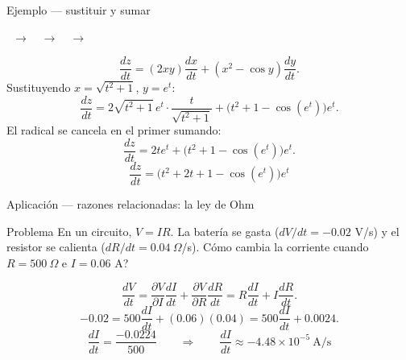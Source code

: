 \documentclass[11pt,aspectratio=169]{beamer}
\newcommand{\rctracker}[1]{%
  {\footnotesize\centering
  \pasoitem{1}{1. Dependencias}{#1}\ $\rightarrow$\
  \pasoitem{2}{2. Parciales de $z$}{#1}\ $\rightarrow$\
  \pasoitem{3}{3. Derivar intermedias}{#1}\ $\rightarrow$\
  \pasoitem{4}{4. Sustituir y sumar}{#1}\par}
  \vspace{4pt}
}
\begin{document}
\begin{frame}{Ejemplo --- sustituir y sumar}
  \rctracker{4}
  \[
    \frac{dz}{dt}=(2xy)\frac{dx}{dt}+(x^2-\cos y)\frac{dy}{dt}.
  \]
  \pause
  Sustituyendo $x=\sqrt{t^2+1}$, $y=e^t$:
  \[
    \frac{dz}{dt}=2\sqrt{t^2+1}\,e^t\cdot\frac{t}{\sqrt{t^2+1}}
                 +\bigl(t^2+1-\cos(e^t)\bigr)e^t.
  \]
  \pause
  El radical se cancela en el primer sumando:
  \[
    \frac{dz}{dt}=2te^t+\bigl(t^2+1-\cos(e^t)\bigr)e^t.
  \]
  \pause
  \vspace{-6pt}
  \[
    \boxed{\frac{dz}{dt}=\bigl(t^2+2t+1-\cos(e^t)\bigr)e^t}
  \]
\end{frame}

\begin{frame}{Aplicación --- razones relacionadas: la ley de Ohm}
  \begin{block}{Problema}
    En un circuito, $V=IR$. La batería se gasta ($dV/dt=-0.02$ V/s) y el resistor se calienta ($dR/dt=0.04\ \Omega$/s). \textquestiondown{}Cómo cambia la corriente cuando $R=500\ \Omega$ e $I=0.06$ A?
  \end{block}
  \pause
  \[
    \frac{dV}{dt}=\frac{\partial V}{\partial I}\frac{dI}{dt}
                 +\frac{\partial V}{\partial R}\frac{dR}{dt}
                 =R\frac{dI}{dt}+I\frac{dR}{dt}.
  \]
  \pause
  \[
    -0.02=500\frac{dI}{dt}+(0.06)(0.04)=500\frac{dI}{dt}+0.0024.
  \]
  \pause
  \[
    \frac{dI}{dt}=\frac{-0.0224}{500}
    \qquad\Longrightarrow\qquad
    \boxed{\frac{dI}{dt}\approx -4.48\times 10^{-5}\ \text{A/s}}
  \]
\end{frame}
\end{document}
